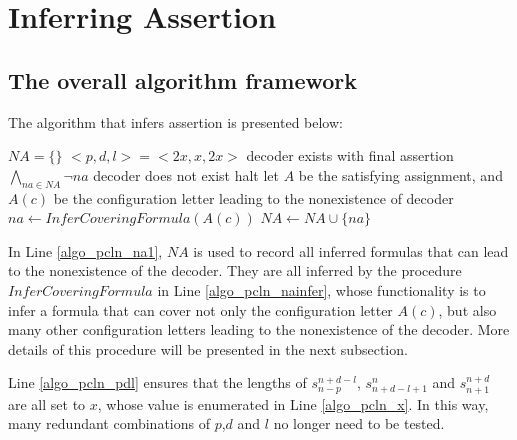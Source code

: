 \documentclass[journal]{IEEEtran}
\begin{document}
\section{Inferring Assertion}\label{sec_algo}
\subsection{The overall algorithm framework}\label{subsec_algo}

The algorithm that infers assertion is presented below:

\begin{algorithm}
\caption{$InferAssertion$}
\label{algo_pcln}
\begin{algorithmic}[1]
\STATE $NA=\{\}$
\label{algo_pcln_na1}
\label{algo_pcln_x}
\STATE $<p,d,l>=<2x,x,2x>$
\label{algo_pcln_pdl}
\label{algo_pcln_pc}
\label{algo_pcln_havedec}
\STATE decoder exists with final assertion $\bigwedge_{na\in NA}\neg na$
\ELSE
\label{algo_pcln_nodec}
\STATE decoder does not exist
\ENDIF
\STATE halt
\label{algo_pcln_halt}
\ELSE
{}
\label{algo_pcln_ln}
\STATE let $A$ be the satisfying assignment, and $A(c)$ be the configuration letter leading to the nonexistence of decoder
\label{algo_pcln_lnc}
\STATE $na\leftarrow InferCoveringFormula(A(c))$
\label{algo_pcln_nainfer}
\STATE $NA\leftarrow NA\cup \{na\}$
\label{algo_pcln_ruleout}
\ENDWHILE
\ENDIF
\ENDFOR
\end{algorithmic}
\end{algorithm}

In Line \ref{algo_pcln_na1},
$NA$ is used to record all inferred formulas that can lead to the nonexistence of the decoder.
They are all inferred by the procedure $InferCoveringFormula$ in Line \ref{algo_pcln_nainfer},
whose functionality is to infer a formula that can cover not only the configuration letter $A(c)$,
but also many other configuration letters leading to the nonexistence of the decoder.
More details of this procedure will be presented in the next subsection.

Line \ref{algo_pcln_pdl} ensures that the lengths of $s_{n-p}^{n+d-l}$, $s_{n+d-l+1}^n$ and $s_{n+1}^{n+d}$ are all set to $x$,
whose value is enumerated in Line \ref{algo_pcln_x}.
In this way,
many redundant combinations of $p$,$d$ and $l$ no longer need to be tested.
\end{document}
